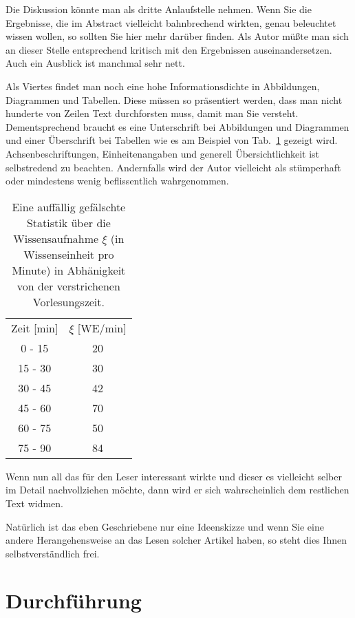 \documentclass[10pt,twocolumn]{scrartcl}
\begin{document}
Die Diskussion könnte man als dritte Anlaufstelle nehmen. Wenn Sie 
die Ergebnisse, die im Abstract vielleicht bahnbrechend wirkten, genau 
beleuchtet wissen wollen, so sollten Sie hier mehr darüber
finden. Als Autor müßte man sich an dieser Stelle entsprechend 
kritisch mit den Ergebnissen auseinandersetzen. Auch ein Ausblick
ist manchmal sehr nett.

Als Viertes findet man noch eine hohe Informationsdichte in
Abbildungen, Diagrammen und Tabellen. Diese müssen so präsentiert werden,
dass man nicht hunderte von Zeilen Text durchforsten muss, damit man Sie versteht.
Dementsprechend braucht es eine Unterschrift bei Abbildungen und Diagrammen 
und einer Überschrift bei Tabellen wie es am Beispiel von Tab.~\ref{tab:falsch}
gezeigt wird. Achsenbeschriftungen, Einheitenangaben
und generell Übersichtlichkeit ist selbstredend zu beachten.
Andernfalls wird der Autor vielleicht als stümperhaft oder mindestens
wenig beflissentlich wahrgenommen.

\begin{table}[t]
\caption{Eine auffällig gefälschte Statistik über die Wissensaufnahme $\xi$
(in Wissenseinheit pro Minute) in Abhänigkeit von der verstrichenen Vorlesungszeit.}
\label{tab:falsch}
\centering
\begin{tabular}{cc}
\rowcolor{dunkelgrau}
Zeit [min] & $\xi$ [WE/min] \\
0 - 15 & 20 \\
\rowcolor{grau}
15 - 30 & 30 \\
30 - 45 & 42 \\
\rowcolor{grau}
45 - 60 & 70 \\
60 - 75 & 50 \\
\rowcolor{grau}
75 - 90 & 84
\end{tabular}
\end{table}

Wenn nun all das für den Leser interessant wirkte und dieser es vielleicht
selber im Detail nachvollziehen möchte, dann wird er sich wahrscheinlich
dem restlichen Text widmen.

Natürlich ist das eben Geschriebene nur eine Ideenskizze und wenn
Sie eine andere Herangehensweise an das Lesen solcher Artikel haben,
so steht dies Ihnen selbstverständlich frei.

\section{Durchführung}
\end{document}
